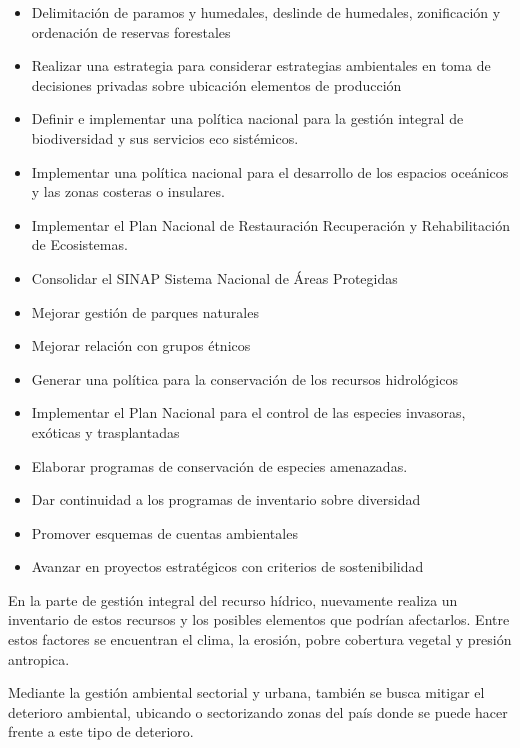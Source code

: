 \documentclass[journal]{./oldtran/IEEEtran}
\begin{document}
\begin{itemize}
\item Delimitación de paramos y humedales, deslinde de humedales, zonificación y ordenación de reservas forestales
\item Realizar una estrategia para considerar estrategias ambientales en toma de decisiones privadas sobre ubicación elementos de producción
\item Definir e implementar una política nacional para la gestión integral de biodiversidad y sus servicios eco sistémicos.
\item Implementar una política nacional para el desarrollo de los espacios oceánicos y las zonas costeras o insulares.
\item Implementar el Plan Nacional de Restauración Recuperación y Rehabilitación de Ecosistemas.
\item Consolidar el SINAP Sistema Nacional de Áreas Protegidas
\item Mejorar gestión de parques naturales
\item Mejorar relación con grupos étnicos
\item Generar una política para la conservación de los recursos hidrológicos
\item Implementar el Plan Nacional para el control de las especies invasoras, exóticas y trasplantadas
\item Elaborar programas de conservación de especies amenazadas.
\item Dar continuidad a los programas de inventario sobre diversidad
\item Promover esquemas de cuentas ambientales
\item Avanzar en proyectos estratégicos con criterios de sostenibilidad

\end{itemize}

En la parte de gestión integral del recurso hídrico, nuevamente realiza un inventario de estos recursos y los posibles elementos que podrían afectarlos. Entre estos factores se encuentran el clima, la erosión, pobre cobertura vegetal y presión antropica.

Mediante la gestión ambiental sectorial y urbana, también se busca mitigar el deterioro ambiental, ubicando o sectorizando zonas del país donde se puede hacer frente a este tipo de deterioro.
\end{document}
